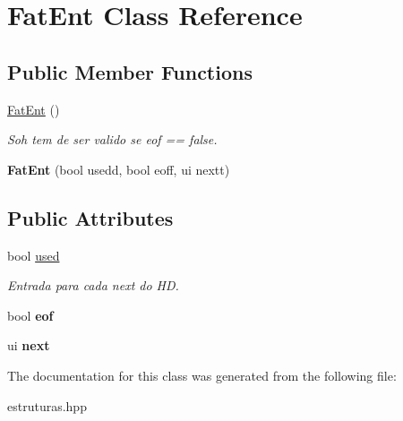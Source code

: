 \hypertarget{classFatEnt}{}\section{Fat\+Ent Class Reference}
\label{classFatEnt}
\subsection*{Public Member Functions}
\begin{DoxyCompactItemize}
\item 
\hyperlink{classFatEnt_abfb1449df55f7f050c1f4b1ae824f8fb}{Fat\+Ent} ()\hypertarget{classFatEnt_abfb1449df55f7f050c1f4b1ae824f8fb}{}\label{classFatEnt_abfb1449df55f7f050c1f4b1ae824f8fb}

\begin{DoxyCompactList}\small\item\em Soh tem de ser valido se eof == false. \end{DoxyCompactList}\item 
{\bfseries Fat\+Ent} (bool usedd, bool eoff, ui nextt)\hypertarget{classFatEnt_ab8dbfac881105965b82ff8ac8e70f9bb}{}\label{classFatEnt_ab8dbfac881105965b82ff8ac8e70f9bb}

\end{DoxyCompactItemize}
\subsection*{Public Attributes}
\begin{DoxyCompactItemize}
\item 
bool \hyperlink{classFatEnt_a0e59fa04e00e0783b198fa76ae108c7b}{used}\hypertarget{classFatEnt_a0e59fa04e00e0783b198fa76ae108c7b}{}\label{classFatEnt_a0e59fa04e00e0783b198fa76ae108c7b}

\begin{DoxyCompactList}\small\item\em Entrada para cada next do HD. \end{DoxyCompactList}\item 
bool {\bfseries eof}\hypertarget{classFatEnt_aed7eb2241c54f6a70f102e6486c47eec}{}\label{classFatEnt_aed7eb2241c54f6a70f102e6486c47eec}

\item 
ui {\bfseries next}\hypertarget{classFatEnt_ad76170e1512882e58e72a75f54975ea8}{}\label{classFatEnt_ad76170e1512882e58e72a75f54975ea8}

\end{DoxyCompactItemize}


The documentation for this class was generated from the following file\+:\begin{DoxyCompactItemize}
\item 
estruturas.\+hpp\end{DoxyCompactItemize}
